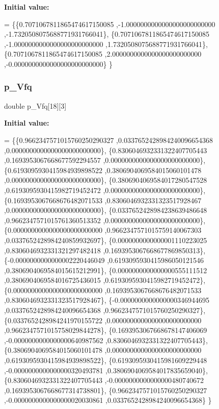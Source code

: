 {\bfseries Initial value\+:}
\begin{DoxyCode}
= \{\{0.7071067811865474617150085 ,-1.0000000000000000000000000 ,-1.7320508075688771931766041\},
\{0.7071067811865474617150085 ,-1.0000000000000000000000000 ,1.7320508075688771931766041\},
\{0.7071067811865474617150085 ,2.0000000000000000000000000 ,-0.0000000000000000000000000\}
\}
\end{DoxyCode}
\mbox{\label{a00987_a99027b5a792f88fe660e1c79d0d762d3}} 
\subsubsection{\texorpdfstring{p\+\_\+\+Vfq}{p\_Vfq}}
{\footnotesize\ttfamily double p\+\_\+\+Vfq\mbox{[}18\mbox{]}\mbox{[}3\mbox{]}}

{\bfseries Initial value\+:}
\begin{DoxyCode}
= \{\{0.9662347571015760250290327 ,0.0337652428984240096654368 ,0.0000000000000000000000000\},
\{0.8306046932331322407705443 ,0.1693953067668677592294557 ,0.0000000000000000000000000\},
\{0.6193095930415984939898522 ,0.3806904069584015060101478 ,0.0000000000000000000000000\},
\{0.3806904069584017280547528 ,0.6193095930415982719452472 ,0.0000000000000000000000000\},
\{0.1693953067668676482071533 ,0.8306046932331323517928467 ,0.0000000000000000000000000\},
\{0.0337652428984238639486648 ,0.9662347571015761360513352 ,0.0000000000000000000000000\},
\{0.0000000000000000000000000 ,0.9662347571015759140067303 ,0.0337652428984240859932697\},
\{0.0000000000000001110223025 ,0.8306046932331321297482418 ,0.1693953067668677869850313\},
\{-0.0000000000000002220446049 ,0.6193095930415986050121546 ,0.3806904069584015615212991\},
\{0.0000000000000000555111512 ,0.3806904069584016725436015 ,0.6193095930415982719452472\},
\{0.0000000000000000000000000 ,0.1693953067668676482071533 ,0.8306046932331323517928467\},
\{-0.0000000000000000346944695 ,0.0337652428984240096654368 ,0.9662347571015760250290327\},
\{0.0337652428984241970155722 ,0.0000000000000000000000000 ,0.9662347571015758029844278\},
\{0.1693953067668678147406069 ,-0.0000000000000000640987562 ,0.8306046932331322407705443\},
\{0.3806904069584015060101478 ,0.0000000000000000000000000 ,0.6193095930415984939898522\},
\{0.6193095930415981609229448 ,-0.0000000000000000320493781 ,0.3806904069584017835659040\},
\{0.8306046932331322407705443 ,-0.0000000000000000480740672 ,0.1693953067668677314738801\},
\{0.9662347571015760250290327 ,-0.0000000000000000020030861 ,0.0337652428984240096654368\}
\}
\end{DoxyCode}
\mbox{\label{a00987_a768a144a60b48f6093157eddf7ee7d72}} 
